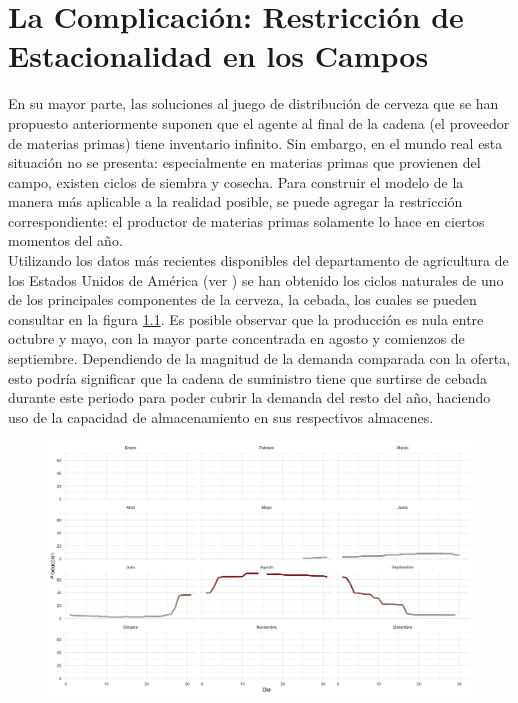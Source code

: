 \chapter{La Complicaci\'on: Restricci\'on de Estacionalidad en los Campos}

En su mayor parte, las soluciones al juego de distribuci\'on de cerveza que se han propuesto anteriormente suponen que el agente al final de la cadena (el proveedor de materias primas) tiene inventario infinito. Sin embargo, en el mundo real esta situaci\'on no se presenta: especialmente en materias primas que provienen del campo, existen ciclos de siembra y cosecha. Para construir el modelo de la manera m\'as aplicable a la realidad posible, se puede agregar la restricci\'on correspondiente: el productor de materias primas solamente lo hace en ciertos momentos del a\~no.\\

Utilizando los datos m\'as recientes disponibles del departamento de agricultura de los Estados Unidos de Am\'erica (ver \citet{USDA}) se han obtenido los ciclos naturales de uno de los principales componentes de la cerveza, la cebada, los cuales se pueden consultar en la figura \ref{fields}. Es posible observar que la producci\'on es nula entre octubre y mayo, con la mayor parte concentrada en agosto y comienzos de septiembre. Dependiendo de la magnitud de la demanda comparada con la oferta, esto podr\'ia significar que la cadena de suministro tiene que surtirse de cebada durante este periodo para poder cubrir la demanda del resto del a\~no, haciendo uso de la capacidad de almacenamiento en sus respectivos almacenes.\\

\begin{figure}[ht!]
\caption{ }
\label{fields}
\includegraphics[width=13cm]{tesis_tex/figs/fields_monthly_supply_ggplot.png}
\centering
\end{figure}

